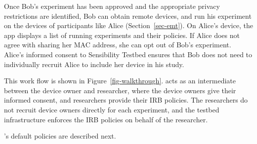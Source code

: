 Once Bob's experiment has been approved and the appropriate privacy
restrictions are identified, Bob can obtain remote devices, and run his experiment on the
devices of participants like Alice (Section~\ref{sec-emt}). On Alice's device, the app displays a 
list of running experiments and their policies. If Alice does not agree with
sharing her MAC address, she can opt out of Bob's experiment. 
Alice's informed consent to Sensibility Testbed
ensures that Bob does not need to individually recruit Alice to include
her device in his study.

This work flow is shown in Figure~\ref{fig-walkthrough}.  \sysname
acts as an intermediate between the device owner and researcher, 
where the device owners give their informed consent, and researchers
provide their IRB policies. The researchers do not recruit
device owners directly for each experiment, and the testbed infrastructure 
enforces the IRB policies on behalf of the researcher. 

\sysname's default policies are described next.

